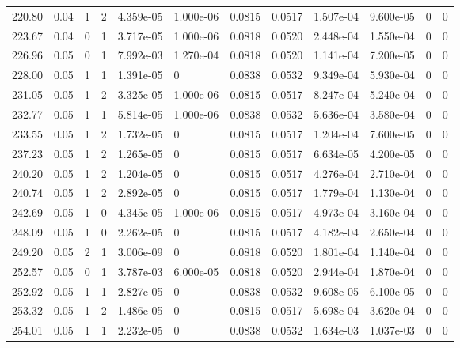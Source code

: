 \documentclass[preview]{standalone}
\begin{document}
{{{\begin{tabular}{L{1.2cm}C{1.2cm} C{0.3cm}C{0.5cm} C{1.4cm}C{1.4cm} C{1.4cm}C{1.4cm} C{1.6cm}C{1.6cm} C{1.6cm}C{1.6cm}}
  220.80  &  0.04  & 1     &  2 &  4.359e-05  & 1.000e-06  &  0.0815&   0.0517& 1.507e-04 & 9.600e-05   &  0 & 0  \\ 
  223.67  &  0.04  & 0     &  1 &  3.717e-05  & 1.000e-06  &  0.0818&   0.0520& 2.448e-04 & 1.550e-04   &  0 & 0  \\ 
  226.96  &  0.05  & 0     &  1 &  7.992e-03  & 1.270e-04  &  0.0818&   0.0520& 1.141e-04 & 7.200e-05   &  0 & 0  \\ 
  228.00  &  0.05  & 1     &  1 &  1.391e-05  & 0  &  0.0838&   0.0532& 9.349e-04 & 5.930e-04   &  0 & 0  \\ 
  231.05  &  0.05  & 1     &  2 &  3.325e-05  & 1.000e-06  &  0.0815&   0.0517& 8.247e-04 & 5.240e-04   &  0 & 0  \\ 
  232.77  &  0.05  & 1     &  1 &  5.814e-05  & 1.000e-06  &  0.0838&   0.0532& 5.636e-04 & 3.580e-04   &  0 & 0  \\ 
  233.55  &  0.05  & 1     &  2 &  1.732e-05  & 0  &  0.0815&   0.0517& 1.204e-04 & 7.600e-05   &  0 & 0  \\ 
  237.23  &  0.05  & 1     &  2 &  1.265e-05  & 0  &  0.0815&   0.0517& 6.634e-05 & 4.200e-05   &  0 & 0  \\ 
  240.20  &  0.05  & 1     &  2 &  1.204e-05  & 0  &  0.0815&   0.0517& 4.276e-04 & 2.710e-04   &  0 & 0  \\ 
  240.74  &  0.05  & 1     &  2 &  2.892e-05  & 0  &  0.0815&   0.0517& 1.779e-04 & 1.130e-04   &  0 & 0  \\ 
  242.69  &  0.05  & 1     &  0 &  4.345e-05  & 1.000e-06  &  0.0815&   0.0517& 4.973e-04 & 3.160e-04   &  0 & 0  \\ 
  248.09  &  0.05  & 1     &  0 &  2.262e-05  & 0  &  0.0815&   0.0517& 4.182e-04 & 2.650e-04   &  0 & 0  \\ 
  249.20  &  0.05  & 2     &  1 &  3.006e-09  & 0  &  0.0818&   0.0520& 1.801e-04 & 1.140e-04   &  0 & 0  \\ 
  252.57  &  0.05  & 0     &  1 &  3.787e-03  & 6.000e-05  &  0.0818&   0.0520& 2.944e-04 & 1.870e-04   &  0 & 0  \\ 
  252.92  &  0.05  & 1     &  1 &  2.827e-05  & 0  &  0.0838&   0.0532& 9.608e-05 & 6.100e-05   &  0 & 0  \\ 
  253.32  &  0.05  & 1     &  2 &  1.486e-05  & 0  &  0.0815&   0.0517& 5.698e-04 & 3.620e-04   &  0 & 0  \\ 
  254.01  &  0.05  & 1     &  1 &  2.232e-05  & 0  &  0.0838&   0.0532& 1.634e-03 & 1.037e-03   &  0 & 0  \\ 

\end{tabular}}}}
\end{document}
